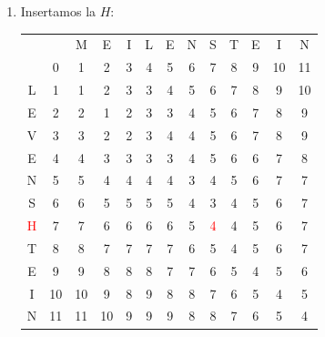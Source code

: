 \documentclass[10pt,a4paper,spanish]{report}
\theoremstyle{definition}
\theoremstyle{remark}
\begin{document}
\begin{enumerate}
\item Insertamos la $H$:
\begin{center}
\begin{tabular}{c|c|c|c|c|c|c|c|c|c|c|c|c|}
\multicolumn{2}{r}{} & \multicolumn{1}{c}{M} & \multicolumn{1}{c}{E} & \multicolumn{1}{c}{I} & \multicolumn{1}{c}{L} & \multicolumn{1}{c}{E} & \multicolumn{1}{c}{N} & \multicolumn{1}{c}{S} & \multicolumn{1}{c}{T} & \multicolumn{1}{c}{E} & \multicolumn{1}{c}{I} & \multicolumn{1}{c}{N} \\ 
\cline{2-13} 
& 0 & 1 & 2 & 3 & 4 & 5 & 6 & 7 & 8 & 9 & 10 & 11 \\
\cline{2-13}
L & 1 & 1 & 2 & 3 & 3 & 4 & 5 & 6 & 7 & 8 & 9 & 10 \\
\cline{2-13} 
E & 2 & 2 & 1 & 2 & 3 & 3 & 4 & 5 & 6 & 7 & 8 & 9 \\
\cline{2-13} 
V & 3 & 3 & 2 & 2 & 3 & 4 & 4 & 5 & 6 & 7 & 8 & 9 \\
\cline{2-13} 
E & 4 & 4 & 3 & 3 & 3 & 3 & 4 & 5 & 6 & 6 & 7 & 8 \\
\cline{2-13} 
N & 5 & 5 & 4 & 4 & 4 & 4 & 3 & 4 & 5 & 6 & 7 & 7 \\
\cline{2-13} 
S & 6 & 6 & 5 & 5 & 5 & 5 & 4 & \cellcolor{Cyan}3 & 4 & 5 & 6 & 7 \\
\cline{2-13} 
\textcolor{Red}{H} & 7 & 7 & 6 & 6 & 6 & 6 & 5 & \textcolor{Red}{4} & 4 & 5 & 6 & 7 \\
\cline{2-13} 
T & 8 & 8 & 7 & 7 & 7 & 7 & 6 & 5 & \cellcolor{Green}4 & 5 & 6 & 7 \\
\cline{2-13}
E & 9 & 9 & 8 & 8 & 8 & 7 & 7 & 6 & 5 & \cellcolor{Green}4 & 5 & 6 \\
\cline{2-13} 
I & 10 & 10 & 9 & 8 & 9 & 8 & 8 & 7 & 6 & 5 & \cellcolor{Green}4 & 5 \\
\cline{2-13} 
N & 11 & 11 & 10 & 9 & 9 & 9 & 8 & 8 & 7 & 6 & 5 & \cellcolor{Green}4 \\
\cline{2-13} 
\end{tabular}
\end{center}


\end{enumerate}
\end{document}
